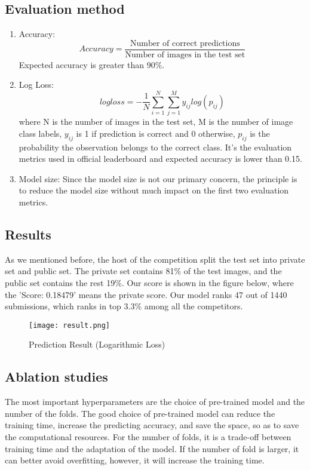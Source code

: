 \documentclass[final]{cvpr}
\begin{document}
    
    \subsection{Evaluation method}
    \begin{enumerate}
    \item Accuracy:
        \[Accuracy=\frac{\text{Number of correct predictions}}{\text{Number of images in the test set}}\]
        Expected accuracy is greater than 90\%.
    \item Log Loss:
        \[logloss=-\frac{1}{N}\sum^N_{i=1}\sum^M_{j=1}y_{ij}log(p_{ij})\]
         where N is the number of images in the test set, M is the number of image class labels, $y_{ij}$ is 1 if prediction is correct and 0 otherwise, $p_{ij}$ is the probability the observation belongs to the correct class. It's the evaluation metrics used in official leaderboard and expected accuracy is lower than 0.15.
    \item Model size:
        Since the model size is not our primary concern, the principle is to reduce the model size
        without much impact on the first two evaluation metrics.
    \end{enumerate}
    \subsection{Results}
    As we mentioned before, the host of the competition split the test set into private set and public set. The private set contains 81\% of the test images, and the public set contains the rest 19\%. Our score is shown in the figure below, where the 'Score: 0.18479' means the private score. Our model ranks 47 out of 1440 submissions, which ranks in top 3.3\% among all the competitors.
        \begin{figure}[htb]
            \centering
            \texttt{[image: result.png]}
            \caption{Prediction Result (Logarithmic Loss)}
            \label{fig:my_label}
        \end{figure}

    \subsection{Ablation studies}
    The most important hyperparameters are the choice of pre-trained model and the number of the folds. The good choice of pre-trained model can reduce the training time, increase the predicting accuracy, and save the space, so as to save the computational resources. For the number of folds, it is a trade-off between training time and the adaptation of the model. If the number of fold is larger, it can better avoid overfitting, however, it will increase the training time.
\end{document}

